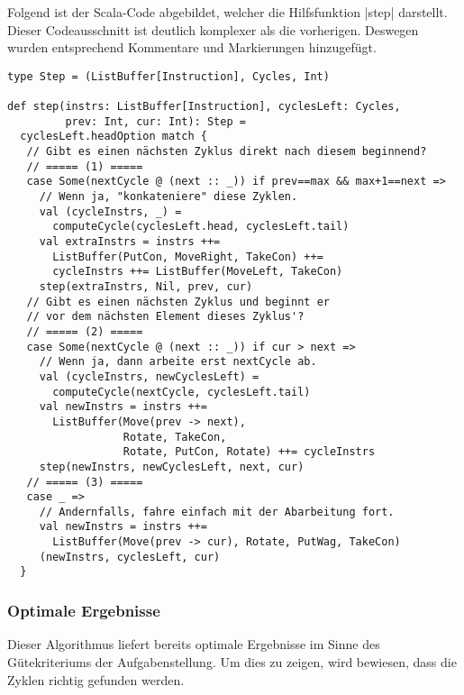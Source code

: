 Folgend ist der Scala-Code abgebildet, welcher die Hilfsfunktion |step| darstellt.
Dieser Codeausschnitt ist deutlich komplexer als die vorherigen. Deswegen wurden entsprechend Kommentare und Markierungen hinzugefügt.
\lstset{basicstyle=\ttfamily}
\begin{lstlisting}
type Step = (ListBuffer[Instruction], Cycles, Int)

def step(instrs: ListBuffer[Instruction], cyclesLeft: Cycles,
         prev: Int, cur: Int): Step =
  cyclesLeft.headOption match {
   // Gibt es einen nächsten Zyklus direkt nach diesem beginnend?
   // ===== (1) =====
   case Some(nextCycle @ (next :: _)) if prev==max && max+1==next =>
     // Wenn ja, "konkateniere" diese Zyklen.
     val (cycleInstrs, _) =
       computeCycle(cyclesLeft.head, cyclesLeft.tail)
     val extraInstrs = instrs ++=
       ListBuffer(PutCon, MoveRight, TakeCon) ++=
       cycleInstrs ++= ListBuffer(MoveLeft, TakeCon)
     step(extraInstrs, Nil, prev, cur)
   // Gibt es einen nächsten Zyklus und beginnt er
   // vor dem nächsten Element dieses Zyklus'?
   // ===== (2) =====
   case Some(nextCycle @ (next :: _)) if cur > next =>
     // Wenn ja, dann arbeite erst nextCycle ab.
     val (cycleInstrs, newCyclesLeft) =
       computeCycle(nextCycle, cyclesLeft.tail)
     val newInstrs = instrs ++=
       ListBuffer(Move(prev -> next),
                  Rotate, TakeCon,
                  Rotate, PutCon, Rotate) ++= cycleInstrs
     step(newInstrs, newCyclesLeft, next, cur)
   // ===== (3) =====
   case _ =>
     // Andernfalls, fahre einfach mit der Abarbeitung fort.
     val newInstrs = instrs ++=
       ListBuffer(Move(prev -> cur), Rotate, PutWag, TakeCon)
     (newInstrs, cyclesLeft, cur)
  }
\end{lstlisting}
\lstset{basicstyle=\ttfamily}

\subsubsection{Optimale Ergebnisse}
\label{opt_res}
Dieser Algorithmus liefert bereits optimale Ergebnisse im Sinne des Güte\-kri\-ter\-iums der Aufgabenstellung.
Um dies zu zeigen, wird bewiesen, dass die Zyklen richtig gefunden werden.
